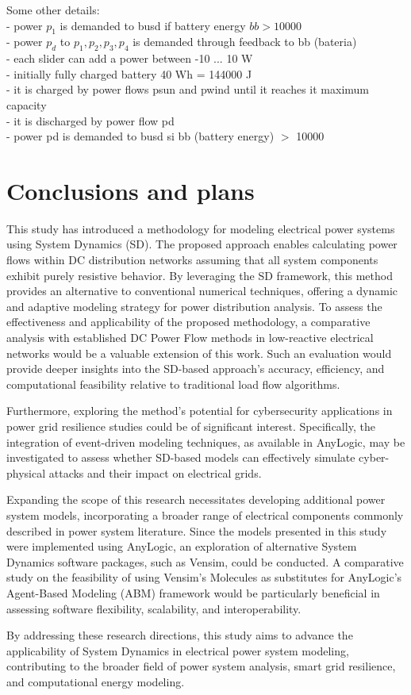 \documentclass[11pt, a4paper]{article}
\theoremstyle{definition}
\theoremstyle{plain}
\theoremstyle{plain}
\theoremstyle{remark}
\theoremstyle{remark}
\theoremstyle{remark}
\begin{document}
{Some other details:\\
- power $p_1$  is demanded to \textsf{busd} if battery energy $bb >10000$\\
- power $ p_d $ to  $ p_1, p_2, p_3, p_4$ is demanded through feedback to \textsf{bb} (bateria)\\
- each slider can add a power between -10 ... 10 W\\
- initially fully charged battery 40 Wh = 144000 J\\ 
- it is charged by power flows \textsf{psun} and \textsf{pwind} until it reaches it maximum capacity\\
- it is discharged by power flow \textsf{pd}\\
- power \textsf{pd} is demanded to \textsf{busd} si bb (battery energy) $ > $ 10000

}

\section{Conclusions and plans}

This study has introduced a methodology for modeling electrical power systems using System Dynamics (SD). The proposed approach enables calculating power flows within DC distribution networks assuming that all system components exhibit purely resistive behavior. By leveraging the SD framework, this method provides an alternative to conventional numerical techniques, offering a dynamic and adaptive modeling strategy for power distribution analysis.
To assess the effectiveness and applicability of the proposed methodology, a comparative analysis with established DC Power Flow methods in low-reactive electrical networks would be a valuable extension of this work. Such an evaluation would provide deeper insights into the SD-based approach's accuracy, efficiency, and computational feasibility relative to traditional load flow algorithms.

Furthermore, exploring the method’s potential for cybersecurity applications in power grid resilience studies could be of significant interest. Specifically, the integration of event-driven modeling techniques, as available in AnyLogic, may be investigated to assess whether SD-based models can effectively simulate cyber-physical attacks and their impact on electrical grids.

Expanding the scope of this research necessitates developing additional power system models, incorporating a broader range of electrical components commonly described in power system literature. Since the models presented in this study were implemented using AnyLogic, an exploration of alternative System Dynamics software packages, such as Vensim, could be conducted. A comparative study on the feasibility of using Vensim's Molecules as substitutes for AnyLogic’s Agent-Based Modeling (ABM) framework would be particularly beneficial in assessing software flexibility, scalability, and interoperability.

By addressing these research directions, this study aims to advance the applicability of System Dynamics in electrical power system modeling, contributing to the broader field of power system analysis, smart grid resilience, and computational energy modeling.
\end{document}
